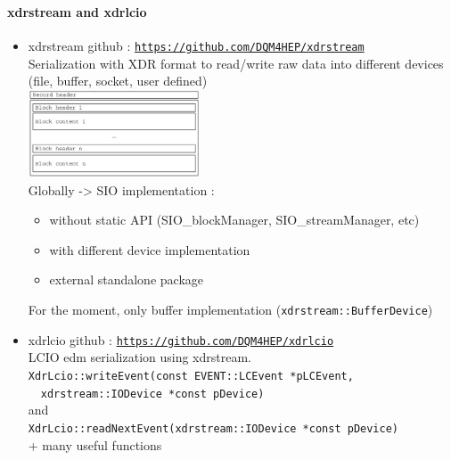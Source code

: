 \documentclass[8pt]{beamer}
\begin{document}
  \begin{frame}[containsverbatim]
  \frametitle{\secname}
  \framesubtitle{xdrstream and xdrlcio}
  
  \begin{itemize}
    \item xdrstream github : \href{https://github.com/DQM4HEP/xdrstream}{\tt https://github.com/DQM4HEP/xdrstream} \\
    Serialization with XDR format to read/write raw data into different devices (file, buffer, socket, user defined) \\
    \includegraphics[width=0.4\textwidth]{figs/xdrstream_structure.pdf} \\
    Globally -> SIO implementation :
    \begin{itemize}
      \item without static API (SIO\_blockManager, SIO\_streamManager, etc)
      \item with different device implementation
      \item external standalone package
    \end{itemize}
    For the moment, only buffer implementation (\verb|xdrstream::BufferDevice|)
    \item xdrlcio github : \href{https://github.com/DQM4HEP/xdrlcio}{\tt https://github.com/DQM4HEP/xdrlcio} \\
    LCIO edm serialization using xdrstream. \\
    \textbullet \verb|XdrLcio::writeEvent(const EVENT::LCEvent *pLCEvent,|\\ 
    ~~\verb|xdrstream::IODevice *const pDevice)| \\
    and \\
    \textbullet \verb|XdrLcio::readNextEvent(xdrstream::IODevice *const pDevice)| \\
    + many useful functions
  \end{itemize}


  
  
  
  \end{frame}
  
  
\end{document}
